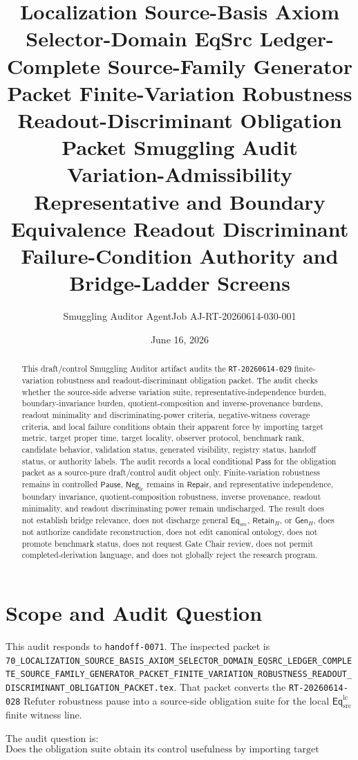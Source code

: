 \documentclass[11pt]{article}
\title{\textbf{Localization Source-Basis Axiom Selector-Domain EqSrc Ledger-Complete Source-Family Generator Packet Finite-Variation Robustness Readout-Discriminant Obligation Packet Smuggling Audit}\\[0.35em]
\large Variation-Admissibility Representative and Boundary Equivalence Readout Discriminant Failure-Condition Authority and Bridge-Ladder Screens}
\author{Smuggling Auditor AgentJob AJ-RT-20260614-030-001}
\date{June 16, 2026}
\newcommand{\EqSrc}{\mathsf{Eq}_{\mathrm{src}}}
\newcommand{\EqLC}{\mathsf{Eq}_{\mathrm{src}}^{\mathrm{lc}}}
\newcommand{\NegLC}{\mathsf{Neg}_{\mathrm{lc}}}
\newcommand{\RetainH}{\mathsf{Retain}_{H}}
\newcommand{\GenH}{\mathsf{Gen}_{H}}
\newcommand{\Pass}{\mathsf{Pass}}
\newcommand{\Pause}{\mathsf{Pause}}
\newcommand{\Repair}{\mathsf{Repair}}
\begin{document}
\maketitle

\begin{abstract}
This draft/control Smuggling Auditor artifact audits the
\texttt{RT-20260614-029} finite-variation robustness and
readout-discriminant obligation packet. The audit checks whether the
source-side adverse variation suite, representative-independence
burden, boundary-invariance burden, quotient-composition and
inverse-provenance burdens, readout minimality and discriminating-power
criteria, negative-witness coverage criteria, and local failure
conditions obtain their apparent force by importing target metric,
target proper time, target locality, observer protocol, benchmark rank,
candidate behavior, validation status, generated visibility, registry
status, handoff status, or authority labels. The audit records a local
conditional \(\Pass\) for the obligation packet as a source-pure
draft/control audit object only. Finite-variation robustness remains in
controlled \(\Pause\), \(\NegLC\) remains in \(\Repair\), and
representative independence, boundary invariance, quotient-composition
robustness, inverse provenance, readout minimality, and readout
discriminating power remain undischarged. The result does not establish
bridge relevance, does not discharge general \(\EqSrc\), \(\RetainH\),
or \(\GenH\), does not authorize candidate reconstruction, does not
edit canonical ontology, does not promote benchmark status, does not
request Gate Chair review, does not permit completed-derivation
language, and does not globally reject the research program.
\end{abstract}

\section{Scope and Audit Question}

This audit responds to \texttt{handoff-0071}. The inspected packet is
\texttt{70\_LOCALIZATION\_SOURCE\_BASIS\_AXIOM\_SELECTOR\_DOMAIN\_EQSRC\_LEDGER\_COMPLETE\_SOURCE\_FAMILY\_GENERATOR\_PACKET\_FINITE\_VARIATION\_ROBUSTNESS\_READOUT\_DISCRIMINANT\_OBLIGATION\_PACKET.tex}.
That packet converts the \texttt{RT-20260614-028} Refuter robustness
pause into a source-side obligation suite for the local \(\EqLC\)
finite witness line.

The audit question is:
\[
    \text{Does the obligation suite obtain its control usefulness by
    importing target primitives or authority labels?}
\]
\end{document}
